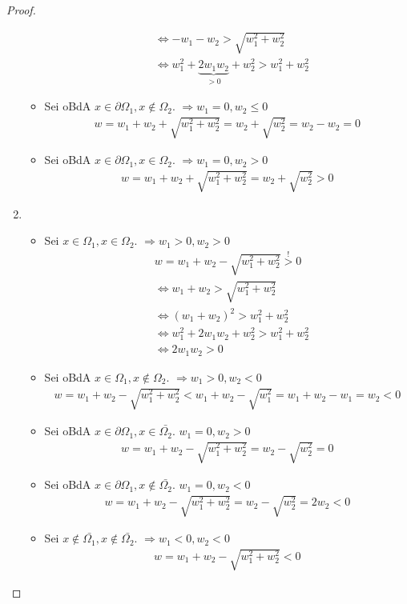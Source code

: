 \begin{proof}
\begin{enumerate}
\begin{itemize}
\begin{align*}
&\Leftrightarrow -w_1 - w_2 > \sqrt{w_1^2 + w_2^2}\\
&\Leftrightarrow w_1^2 + \underbrace{2w_1 w_2}_{>0} +w_2^2 > w_1^2 + w_2^2
\end{align*}
\item
Sei \ac{oBdA} $x \in \partial \Omega_1, x \notin \Omega_2$. $\Rightarrow w_1 = 0, w_2 \leq 0$
\begin{align*}
w =  w_1 + w_2 + \sqrt{w_1^2 + w_2^2} = w_2 + \sqrt{w_2^2} = w_2 - w_2 = 0
\end{align*}
\item
Sei \ac{oBdA} $x \in \partial \Omega_1, x \in \Omega_2$. $\Rightarrow w_1 = 0, w_2 > 0$
\begin{align*}
w = w_1 + w_2 + \sqrt{w_1^2 + w_2^2} = w_2 + \sqrt{w_2^2} > 0
\end{align*}
\end{itemize}
\item
\begin{itemize}
\item
Sei $x \in \Omega_1, x \in \Omega_2$. $\Rightarrow w_1 >0, w_2 >0$
\begin{align*}
&w = w_1 + w_2 - \sqrt{w_1^2 + w_2^2} \overset{!}{>}0\\
&\Leftrightarrow w_1 + w_2 > \sqrt{w_1^2 + w_2^2}\\
&\Leftrightarrow (w_1 + w_2)^2 > w_1^2 + w_2^2\\
&\Leftrightarrow w_1^2 + 2w_1 w_2 + w_2^2 > w_1^2 + w_2^2\\
&\Leftrightarrow 2w_1 w_2 >0
\end{align*}
\item
Sei \ac{oBdA} $x \in \Omega_1, x \notin \Omega_2$. $\Rightarrow w_1 >0, w_2 <0$
\begin{align*}
w = w_1 + w_2 - \sqrt{w_1^2 + w_2^2} < w_1 + w_2 - \sqrt{w_1^2} = w_1+w_2-w_1 = w_2 <0
\end{align*}
\item
Sei \ac{oBdA} $x \in \partial \Omega_1, x \in \bar{\Omega_2}$. $w_1 = 0, w_2 > 0$
\begin{align*}
w = w_1 + w_2 - \sqrt{w_1^2+w_2^2} = w_2 - \sqrt{w_2^2} = 0
\end{align*}
\item
Sei \ac{oBdA} $x \in \partial \Omega_1, x \notin \bar{\Omega_2}$. $w_1 = 0, w_2 < 0$
\begin{align*}
w = w_1 + w_2 - \sqrt{w_1^2 + w_2^2} = w_2 - \sqrt{w_2^2} = 2w_2 < 0
\end{align*}
\item
Sei $x \notin \bar{\Omega_1}, x \notin \bar{\Omega_2}$. $\Rightarrow w_1 < 0, w_2 < 0$
\begin{align*}
w = w_1 + w_2 - \sqrt{w_1^2 + w_2^2} < 0
\end{align*}
\end{itemize}
\end{enumerate}
\end{proof}


